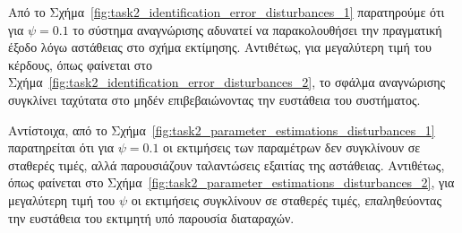 \documentclass[a4paper,12pt]{article}
\begin{document}
Από το Σχήμα~\ref{fig:task2_identification_error_disturbances_1} παρατηρούμε ότι για $\psi = 0.1$
το σύστημα αναγνώρισης αδυνατεί να παρακολουθήσει την πραγματική έξοδο λόγω αστάθειας στο σχήμα εκτίμησης. 
Αντιθέτως, για μεγαλύτερη τιμή του κέρδους, όπως φαίνεται στο 
Σχήμα~\ref{fig:task2_identification_error_disturbances_2}, το σφάλμα αναγνώρισης συγκλίνει ταχύτατα στο μηδέν 
επιβεβαιώνοντας την ευστάθεια του συστήματος.

Αντίστοιχα, από το Σχήμα~\ref{fig:task2_parameter_estimations_disturbances_1} παρατηρείται ότι για $\psi = 0.1$
οι εκτιμήσεις των παραμέτρων δεν συγκλίνουν σε σταθερές τιμές, αλλά παρουσιάζουν ταλαντώσεις εξαιτίας της 
αστάθειας. Αντιθέτως, όπως φαίνεται στο Σχήμα~\ref{fig:task2_parameter_estimations_disturbances_2}, για 
μεγαλύτερη τιμή του $\psi$ οι εκτιμήσεις συγκλίνουν σε σταθερές τιμές, επαληθεύοντας την ευστάθεια του 
εκτιμητή υπό παρουσία διαταραχών.
\end{document}
